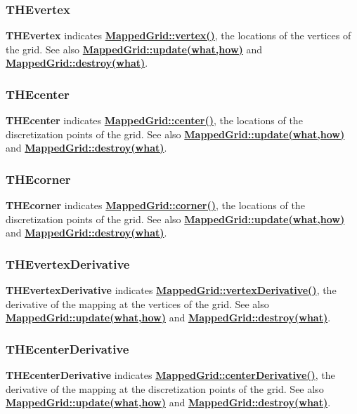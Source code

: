 \documentclass{article}
\begin{document}
  \subsubsection{THEvertex}
  \label{MappedGrid::THEvertex}
    \textbf{THEvertex} indicates {\bf{}\hyperref{vertex()}{vertex() \rm(\S}{)}{MappedGrid::vertex()}},
    the locations of the vertices of the grid.
    See also {\bf{}\hyperref{update(what,how)}{update(what,how) \rm(\S}{)}{MappedGrid::update(what,how)}}
    and {\bf{}\hyperref{destroy(what)}{destroy(what) \rm(\S}{)}{MappedGrid::destroy(what)}}.

  \subsubsection{THEcenter}
  \label{MappedGrid::THEcenter}
    \textbf{THEcenter} indicates {\bf{}\hyperref{center()}{center() \rm(\S}{)}{MappedGrid::center()}},
    the locations of the discretization points of the grid.
    See also {\bf{}\hyperref{update(what,how)}{update(what,how) \rm(\S}{)}{MappedGrid::update(what,how)}}
    and {\bf{}\hyperref{destroy(what)}{destroy(what) \rm(\S}{)}{MappedGrid::destroy(what)}}.

  \subsubsection{THEcorner}
  \label{MappedGrid::THEcorner}
    \textbf{THEcorner} indicates {\bf{}\hyperref{corner()}{corner() \rm(\S}{)}{MappedGrid::corner()}},
    the locations of the discretization points of the grid.
    See also {\bf{}\hyperref{update(what,how)}{update(what,how) \rm(\S}{)}{MappedGrid::update(what,how)}}
    and {\bf{}\hyperref{destroy(what)}{destroy(what) \rm(\S}{)}{MappedGrid::destroy(what)}}.

  \subsubsection{THEvertexDerivative}
  \label{MappedGrid::THEvertexDerivative}
    \textbf{THEvertexDerivative} indicates {\bf{}\hyperref{vertexDerivative()}{vertexDerivative() \rm(\S}{)}{MappedGrid::vertexDerivative()}},
    the derivative of the mapping at the vertices of the grid.
    See also {\bf{}\hyperref{update(what,how)}{update(what,how) \rm(\S}{)}{MappedGrid::update(what,how)}}
    and {\bf{}\hyperref{destroy(what)}{destroy(what) \rm(\S}{)}{MappedGrid::destroy(what)}}.

  \subsubsection{THEcenterDerivative}
  \label{MappedGrid::THEcenterDerivative}
    \textbf{THEcenterDerivative} indicates {\bf{}\hyperref{centerDerivative()}{centerDerivative() \rm(\S}{)}{MappedGrid::centerDerivative()}},
    the derivative of the mapping at the discretization points of the grid.
    See also {\bf{}\hyperref{update(what,how)}{update(what,how) \rm(\S}{)}{MappedGrid::update(what,how)}}
    and {\bf{}\hyperref{destroy(what)}{destroy(what) \rm(\S}{)}{MappedGrid::destroy(what)}}.
\end{document}
